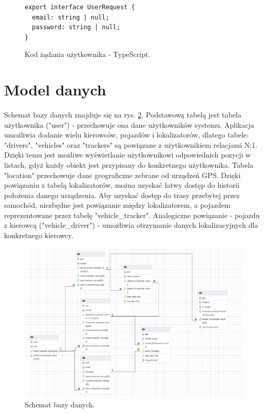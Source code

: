 \begin{figure}
\centering
\begin{lstlisting}
export interface UserRequest {
  email: string | null;
  password: string | null;
}
\end{lstlisting}
\caption{Kod żądania użytkownika - TypeScript.}
\label{fig:kod:dto}
\end{figure}

\section{Model danych}
\paragraph{}
Schemat bazy danych znajduje się na rys. \ref{fig:database}. Podstawową tabelą jest tabela użytkownika ("user") - przechowuje ona dane użytkowników systemu. Aplikacja umożliwia dodanie wielu kierowców, pojazdów i lokalizatorów, dlatego tabele: "drivers", "vehicles" oraz "trackers" są powiązane z użytkownikiem relacjami N:1. Dzięki temu jest możliwe wyświetlanie użytkownikowi odpowiednich pozycji w listach, gdyż każdy obiekt jest przypisany do konkretnego użytkownika. Tabela "location" przechowuje dane geograficzne zebrane od urządzeń GPS. Dzięki powiązaniu z tabelą lokalizatorów, można uzyskać łatwy dostęp do historii położenia danego urządzenia. Aby uzyskać dostęp do trasy przebytej przez samochód, niezbędne jest powiązanie między lokalizatorem, a pojazdem reprezentowane przez tabelę "vehicle\_tracker". Analogiczne powiązanie - pojazdu z kierowcą ("vehicle\_driver") - umożłiwia otrzymanie danych lokalizacyjnych dla konkretnego kierowcy.

\begin{figure}
	\centering
	\includegraphics[width=1\textwidth]{./graf/database.png}
	\caption{Schemat bazy danych.}
	\label{fig:database}
\end{figure}

